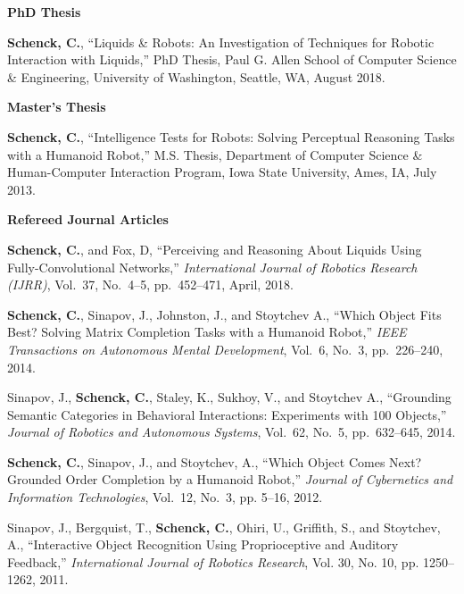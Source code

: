 \documentclass[10pt]{article}
\newcommand{\halfblankline}{\quad\vspace{-0.9\baselineskip}\pagebreak[3]}
\begin{document}
\begin{outerlist}

\item[] \textbf{PhD Thesis}
	\begin{innerlist}
		\item \textbf{Schenck, C.}, ``Liquids \& Robots: An Investigation of Techniques for Robotic Interaction with Liquids,'' PhD Thesis, Paul G. Allen School of Computer Science \& Engineering, University of Washington, Seattle, WA, August 2018.
	\end{innerlist}

\halfblankline

\item[] \textbf{Master's Thesis}
	\begin{innerlist}
		\item \textbf{Schenck, C.}, ``Intelligence Tests for Robots: Solving Perceptual Reasoning Tasks with a Humanoid Robot,'' M.S. Thesis, Department of Computer Science \& Human-Computer Interaction Program, Iowa State University, Ames, IA, July 2013.
	\end{innerlist}

\halfblankline

\item[] \textbf{Refereed Journal Articles}
	\begin{innerlist}
	    \item \textbf{Schenck, C.}, and Fox, D, ``Perceiving and Reasoning About Liquids Using Fully-Convolutional Networks,'' \emph{International Journal of Robotics Research (IJRR)}, Vol.~37, No.~4--5, pp.~452--471, April, 2018.
		\item \textbf{Schenck, C.}, Sinapov, J., Johnston, J., and Stoytchev A., ``Which Object Fits Best? Solving Matrix Completion Tasks with a Humanoid Robot,'' \emph{IEEE Transactions on Autonomous Mental Development}, Vol.~6, No.~3, pp.~226--240, 2014.
		\item Sinapov, J., \textbf{Schenck, C.}, Staley, K., Sukhoy, V., and Stoytchev A., ``Grounding Semantic Categories in Behavioral Interactions: Experiments with 100 Objects,'' \emph{Journal of Robotics and Autonomous Systems}, Vol.~62, No.~5, pp.~632--645, 2014.	
		\item \textbf{Schenck, C.}, Sinapov, J., and Stoytchev, A., ``Which Object Comes Next? Grounded Order Completion by a Humanoid Robot,'' \emph{Journal of Cybernetics and Information Technologies}, Vol.~12, No.~3, pp. 5--16, 2012.
		\item Sinapov, J., Bergquist, T., \textbf{Schenck, C.}, Ohiri, U., Griffith, S., and Stoytchev, A., ``Interactive Object Recognition Using Proprioceptive and Auditory Feedback,'' \emph{International Journal of Robotics Research}, Vol. 30, No. 10, pp. 1250--1262, 2011.
	\end{innerlist}


\end{outerlist}
\end{document}
